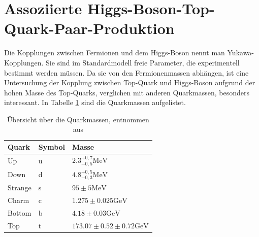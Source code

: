 \section{Assoziierte Higgs-Boson-Top-Quark-Paar-Produktion}
\label{ch:Theorie:sec:ttH}

Die Kopplungen zwischen Fermionen und dem Higgs-Boson nennt man Yukawa-Kopplungen.
Sie sind im Standardmodell freie Parameter, die experimentell bestimmt werden m\"ussen. Da sie von den Fermionenmassen abh\"angen, ist eine Untersuchung der Kopplung zwischen Top-Quark und Higgs-Boson aufgrund der hohen Masse des Top-Quarks, verglichen mit anderen Quarkmassen, besonders interessant. In Tabelle \ref{tab:quarkmasse} sind die Quarkmassen aufgelistet.\\

\begin{table}[tbp]\parbox{12cm}{
  \caption[Quarkmassen]{\"Ubersicht \"uber die Quarkmassen, entnommen aus {\rm \cite{Agashe:2014kda}}
  }\label{tab:quarkmasse}}
  \begin{center}
  \begin{tabular}{lll}
  \hline
  {\bf Quark} & {\bf Symbol} & {\bf Masse}  \\
  \hline \hline
     Up		& u & $\num{2,3}^{{+0,7}}_{{-0,5}}\si{\mega\electronvolt}$ \\
     Down	& d & $\num{4,8}^{{+0,5}}_{{-0,3}}\si{\mega\electronvolt}$ \\
     Strange& s & $\num{95}\pm \num{5}\si{\mega\electronvolt}$ \\
     Charm	& c & $\num{1,275}\pm \num{0,025}\si{\giga\electronvolt}$ \\ 
  	 Bottom & b & $\num{4,18}\pm \num{0,03}\si{\giga\electronvolt}$ \\
     Top    & t & $\num{173,07}\pm \num{0,52}\pm \num{0,72}\si{\giga\electronvolt}$\\                                
  \hline
  \end{tabular}
  \end{center}
\end{table}

